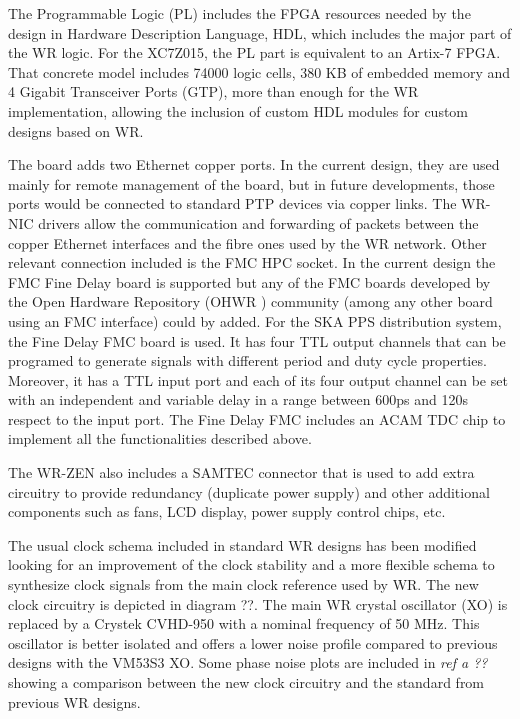 The Programmable Logic (PL) includes the FPGA resources needed 
by the design in Hardware Description Language, HDL, which includes the major part of the WR logic. For the XC7Z015, the PL part is equivalent to an Artix-7 FPGA. That concrete model includes 74000 logic cells, 380 KB of embedded memory and 4 Gigabit Transceiver Ports (GTP), more than enough for the WR implementation, allowing the inclusion of custom HDL modules for custom designs based on WR.

The board adds two Ethernet copper ports. In the current design, they are used mainly for remote management of the board, but in future developments, those ports would be connected to standard PTP devices via copper links. The WR-NIC drivers allow the communication and forwarding of packets between the copper Ethernet interfaces and the fibre ones used by the WR network. Other relevant connection included is the FMC HPC socket. In the current design the FMC Fine Delay board 
is supported but any of the FMC boards developed by the Open Hardware 
Repository (OHWR \cite{ohwr:repo}) community (among any other board using an FMC interface) could by added. For the SKA PPS distribution system, the Fine Delay FMC board \cite{ohwr:fmc-fine-delay} is used. It has four TTL output channels that can be programed to generate signals with different period and duty cycle properties. Moreover, it has a TTL input port and each of its four output channel can be set with an independent and variable delay in a range between 600ps and 120s respect to the input port. The Fine Delay FMC includes an ACAM TDC chip to implement all the functionalities described above. 

The WR-ZEN also includes a SAMTEC connector that is used to add extra circuitry to provide redundancy (duplicate power supply) and other additional components such as fans, LCD display, power supply control chips, etc.

The usual clock schema included in standard WR designs has been modified looking for an improvement of the clock stability and a more flexible schema to synthesize clock signals from the main clock reference used by WR. The new clock circuitry is depicted in diagram ??. The main WR crystal oscillator (XO) is replaced by a Crystek CVHD-950 with a nominal frequency of 50 MHz. This oscillator is better isolated and offers a lower noise profile compared to previous designs with the VM53S3 XO. Some phase noise plots are included in  \textit{ref a ??} showing a comparison between the new clock circuitry and the standard from previous WR designs. 

